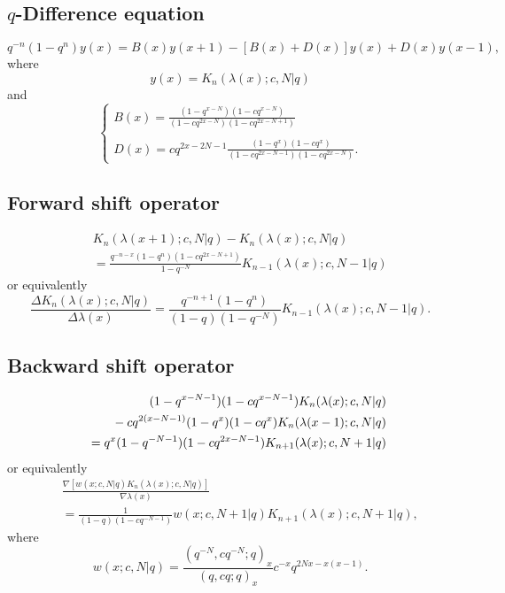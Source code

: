 \documentclass[envcountchap,graybox]{svmono}
\newcommand{\mathindent}{\hspace{7.5mm}}
\begin{document}
\subsection*{$q$-Difference equation}
\begin{equation}
\label{dvDualqKrawtchouk}
q^{-n}(1-q^n)y(x)=B(x)y(x+1)-\left[B(x)+D(x)\right]y(x)+D(x)y(x-1),
\end{equation}
where
$$y(x)=K_n(\lambda(x);c,N|q)$$
and
$$\left\{\begin{array}{l}\displaystyle B(x)=\frac{(1-q^{x-N})(1-cq^{x-N})}{(1-cq^{2x-N})(1-cq^{2x-N+1})}\\
\\
\displaystyle D(x)=cq^{2x-2N-1}\frac{(1-q^x)(1-cq^x)}{(1-cq^{2x-N-1})(1-cq^{2x-N})}.\end{array}\right.$$

\newpage

\subsection*{Forward shift operator}
\begin{eqnarray}
\label{shift1DualqKrawtchoukI}
& &K_n(\lambda(x+1);c,N|q)-K_n(\lambda(x);c,N|q)\nonumber\\
& &{}=\frac{q^{-n-x}(1-q^n)(1-cq^{2x-N+1})}{1-q^{-N}}
K_{n-1}(\lambda(x);c,N-1|q)
\end{eqnarray}
or equivalently
\begin{equation}
\label{shift1DualqKrawtchoukII}
\frac{\Delta K_n(\lambda(x);c,N|q)}{\Delta\lambda(x)}=
\frac{q^{-n+1}(1-q^n)}{(1-q)(1-q^{-N})}K_{n-1}(\lambda(x);c,N-1|q).
\end{equation}

\subsection*{Backward shift operator}
\begin{eqnarray}
\label{shift2DualqKrawtchoukI}
& &(1-q^{x-N-1})(1-cq^{x-N-1})K_n(\lambda(x);c,N|q)\nonumber\\
& &{}\mathindent{}-cq^{2(x-N-1)}(1-q^x)(1-cq^x)K_n(\lambda(x-1);c,N|q)\nonumber\\
& &{}=q^x(1-q^{-N-1})(1-cq^{2x-N-1})K_{n+1}(\lambda(x);c,N+1|q)
\end{eqnarray}
or equivalently
\begin{eqnarray}
\label{shift2DualqKrawtchoukII}
& &\frac{\nabla\left[w(x;c,N|q)K_n(\lambda(x);c,N|q)\right]}{\nabla\lambda(x)}\nonumber\\
& &{}=\frac{1}{(1-q)(1-cq^{-N-1})}w(x;c,N+1|q)K_{n+1}(\lambda(x);c,N+1|q),
\end{eqnarray}
where
$$w(x;c,N|q)=\frac{(q^{-N},cq^{-N};q)_x}{(q,cq;q)_x}c^{-x}q^{2Nx-x(x-1)}.$$
\end{document}
